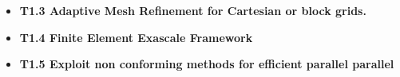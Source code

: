 \begin{itemize}
    \item {\bf T1.3 Adaptive Mesh Refinement for Cartesian or block grids.}
    \item {\bf T1.4 Finite Element Exascale Framework}
    \item {\bf T1.5 Exploit non conforming methods for efficient parallel parallel}
    

\end{itemize}
